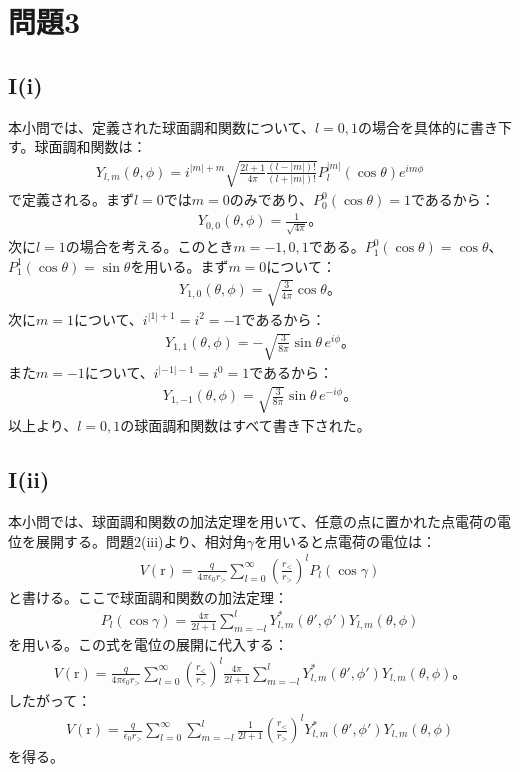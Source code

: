 \documentclass[platex,dvipdfmx,a4paper]{jsarticle}
\newcommand{\vect}[1]{\boldsymbol{\mathrm{#1}}}
\newcommand{\ssum}[3]{\sum_{#1=#2}^#3}
\begin{document}
  \section{問題3}
  
  \subsection*{I(i)}
  本小問では、定義された球面調和関数について、$l=0,1$の場合を具体的に書き下す。球面調和関数は：
  \begin{align*}
    Y_{l,m}(\theta,\phi)=i^{|m|+m}\sqrt{\frac{2l+1}{4\pi}\frac{(l-|m|)!}{(l+|m|)!}}P_l^{|m|}(\cos\theta)e^{im\phi}
  \end{align*}
  で定義される。まず$l=0$では$m=0$のみであり、$P_0^0(\cos\theta)=1$であるから：
  \begin{align*}
    Y_{0,0}(\theta,\phi)=\frac{1}{\sqrt{4\pi}}。
  \end{align*}
  次に$l=1$の場合を考える。このとき$m=-1,0,1$である。$P_1^0(\cos\theta)=\cos\theta$、$P_1^1(\cos\theta)=\sin\theta$を用いる。まず$m=0$について：
  \begin{align*}
    Y_{1,0}(\theta,\phi)=\sqrt{\frac{3}{4\pi}}\cos\theta。
  \end{align*}
  次に$m=1$について、$i^{|1|+1}=i^2=-1$であるから：
  \begin{align*}
    Y_{1,1}(\theta,\phi)=-\sqrt{\frac{3}{8\pi}}\sin\theta\,e^{i\phi}。
  \end{align*}
  また$m=-1$について、$i^{|-1|-1}=i^0=1$であるから：
  \begin{align*}
    Y_{1,-1}(\theta,\phi)=\sqrt{\frac{3}{8\pi}}\sin\theta\,e^{-i\phi}。
  \end{align*}
  以上より、$l=0,1$の球面調和関数はすべて書き下された。
  
  \subsection*{I(ii)}
  本小問では、球面調和関数の加法定理を用いて、任意の点に置かれた点電荷の電位を展開する。問題2(iii)より、相対角$\gamma$を用いると点電荷の電位は：
  \begin{align*}
    V(\vect{r})=\frac{q}{4\pi\epsilon_0 r_>}\ssum{l}{0}{\infty}\left(\frac{r_<}{r_>}\right)^lP_l(\cos\gamma)
  \end{align*}
  と書ける。ここで球面調和関数の加法定理：
  \begin{align*}
    P_l(\cos\gamma)=\frac{4\pi}{2l+1}\ssum{m}{-l}{l}Y_{l,m}^*(\theta',\phi')Y_{l,m}(\theta,\phi)
  \end{align*}
  を用いる。この式を電位の展開に代入する：
  \begin{align*}
    V(\vect{r})=\frac{q}{4\pi\epsilon_0 r_>}\ssum{l}{0}{\infty}\left(\frac{r_<}{r_>}\right)^l\frac{4\pi}{2l+1}\ssum{m}{-l}{l}Y_{l,m}^*(\theta',\phi')Y_{l,m}(\theta,\phi)。
  \end{align*}
  したがって：
  \begin{align*}
    V(\vect{r})=\frac{q}{\epsilon_0 r_>}\ssum{l}{0}{\infty}\ssum{m}{-l}{l}\frac{1}{2l+1}\left(\frac{r_<}{r_>}\right)^lY_{l,m}^*(\theta',\phi')Y_{l,m}(\theta,\phi)
  \end{align*}
  を得る。
  
\end{document}
